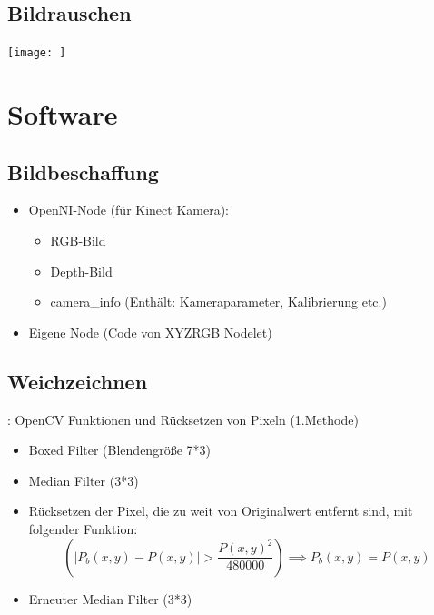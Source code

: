 \documentclass{VLKlauck}
\begin{document}
	
	\subsection{Bildrauschen}
	\begin{frame}{\insertsubsection}	
		\texttt{[image: ]}
	\end{frame}
	
	
	
	
	\section{Software}  
	\subsection{Bildbeschaffung}
	\begin{frame}{\insertsubsection}
		\begin{itemize}
		  \item OpenNI-Node (für Kinect Kamera):
		  \begin{itemize}	
		    \item RGB-Bild
		    \item Depth-Bild
		    \item camera\_info (Enthält: Kameraparameter, Kalibrierung etc.)
		  \end{itemize}
		  \item Eigene Node (Code von XYZRGB Nodelet)
		\end{itemize}
	\end{frame}
	
	
	
	
	\subsection{Weichzeichnen}
	\begin{frame}{\insertsubsection: OpenCV Funktionen und Rücksetzen von Pixeln (1.Methode)}
	\begin{itemize}
     \item Boxed Filter (Blendengröße 7*3)
     \item Median Filter (3*3)
     \item Rücksetzen der Pixel, die zu weit von Originalwert entfernt sind, mit folgender Funktion:\\
   			$$
      			\left(\left|{P_b(x,y)-P(x,y)}\right|>{\frac{P(x,y)^2}{480000}}\right)\implies P_b(x,y)=P(x,y)
			$$
	 \item Erneuter Median Filter (3*3)
    \end{itemize}
	\end{frame}
	
\end{document}
